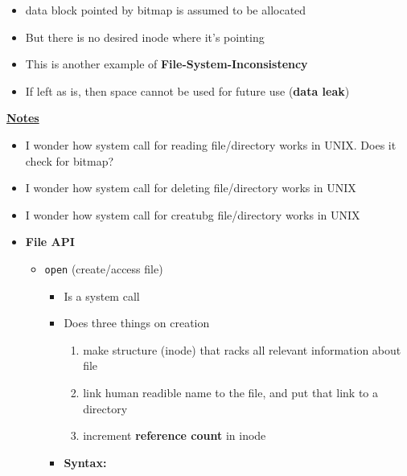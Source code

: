 \documentclass[12pt]{article}
\begin{document}
\begin{enumerate}[1.]
\begin{enumerate}[a)]
\begin{itemize}
\begin{itemize}
                \begin{itemize}
                    \item data block pointed by bitmap is assumed to be allocated
                    \item But there is no desired inode where it's pointing
                    \item This is another example of \textbf{File-System-Inconsistency}
                    \item If left as is, then space cannot be used for future use (\textbf{data leak})
                \end{itemize}
            \end{itemize}
        \end{itemize}

        \bigskip

        \underline{\textbf{Notes}}

        \begin{itemize}
            \item I wonder how system call for reading file/directory works in UNIX. Does it check for bitmap?
            \item I wonder how system call for deleting file/directory works in UNIX
            \item I wonder how system call for creatubg file/directory works in UNIX

            \item \textbf{File API}
            \begin{itemize}
                \item \texttt{open} (create/access file)
                \begin{itemize}
                    \item Is a system call
                    \item Does three things on creation

                    \begin{enumerate}[1)]
                        \item make structure (inode) that racks all relevant information about file
                        \item link human readible name to the file, and put that link to a directory
                        \item increment \textbf{reference count} in inode
                    \end{enumerate}

                    \item \textbf{Syntax:}


\end{itemize}
\end{itemize}
\end{itemize}
\end{enumerate}
\end{enumerate}
\end{document}

